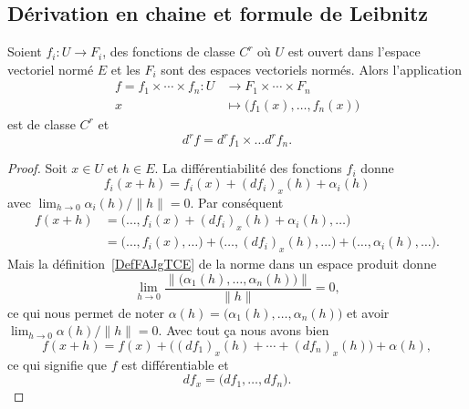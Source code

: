 \subsection{Dérivation en chaine et formule de Leibnitz}

\begin{proposition} \label{PropOYtgIua}
    Soient \( f_i\colon U\to F_i\), des fonctions de classe \( C^r\) où \( U\) est ouvert dans l'espace vectoriel normé \( E\) et les \( F_i\) sont des espaces vectoriels normés. Alors l'application
    \begin{equation}
        \begin{aligned}
        f=f_1\times \cdots\times f_n\colon U&\to F_1\times \cdots\times F_n \\
    x&\mapsto \big( f_1(x),\ldots, f_n(x) \big)
        \end{aligned}
    \end{equation}
    est de classe \( C^r\) et
    \begin{equation}
    d^rf=d^rf_1\times\ldots d^rf_n.
    \end{equation}
\end{proposition}

\begin{proof}
    Soit \( x\in U\) et \( h\in E\). La différentiabilité des fonctions \( f_i\) donne
    \begin{equation}
        f_i(x+h)=f_i(x)+(df_i)_x(h)+\alpha_i(h)
    \end{equation}
    avec \( \lim_{h\to 0} \alpha_i(h)/\| h \|=0\). Par conséquent
    \begin{subequations}
        \begin{align}
            f(x+h)&=\big( \ldots, f_i(x)+(df_i)_x(h)+\alpha_i(h),\ldots \big)\\
            &= \big( \ldots,f_i(x),\ldots \big)+ \big( \ldots,(df_i)_x(h),\ldots \big)+ \big( \ldots,\alpha_i(h),\ldots \big).
        \end{align}
    \end{subequations}
    Mais la définition~\ref{DefFAJgTCE} de la norme dans un espace produit donne
    \begin{equation}
        \lim_{h\to 0} \frac{ \| \big( \alpha_1(h),\ldots, \alpha_n(h) \big) \| }{ \| h \| }=0,
    \end{equation}
    ce qui nous permet de noter \( \alpha(h)=\big( \alpha_1(h),\ldots, \alpha_n(h) \big)\) et avoir \( \lim_{h\to 0} \alpha(h)/\| h \|=0\). Avec tout ça nous avons bien
    \begin{equation}
        f(x+h)=f(x)+\big( (df_1)_x(h)+\cdots +(df_n)_x(h) \big)+\alpha(h),
    \end{equation}
    ce qui signifie que \( f\) est différentiable et
    \begin{equation}
        df_x=\big( df_1,\ldots, df_n \big).
    \end{equation}
\end{proof}

